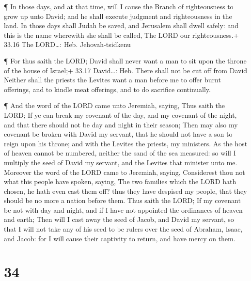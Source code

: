  ¶ In those days, and at that time, will I cause the Branch
of righteousness to grow up unto David; and he shall execute judgment
and righteousness in the land.  In those days shall Judah
be saved, and Jerusalem shall dwell safely: and this is the name
wherewith she shall be called, The LORD our righteousness.+ 33.16 The
LORD\ldots: Heb. Jehovah-tsidkenu

 ¶ For thus saith the LORD; David shall never want a man to
sit upon the throne of the house of Israel;+ 33.17 David\ldots: Heb.
There shall not be cut off from David  Neither shall the
priests the Levites want a man before me to offer burnt offerings, and
to kindle meat offerings, and to do sacrifice continually.

 ¶ And the word of the LORD came unto Jeremiah, saying,
 Thus saith the LORD; If ye can break my covenant of the
day, and my covenant of the night, and that there should not be day and
night in their season;  Then may also my covenant be broken
with David my servant, that he should not have a son to reign upon his
throne; and with the Levites the priests, my ministers.  As
the host of heaven cannot be numbered, neither the sand of the sea
measured: so will I multiply the seed of David my servant, and the
Levites that minister unto me.  Moreover the word of the
LORD came to Jeremiah, saying,  Considerest thou not what
this people have spoken, saying, The two families which the LORD hath
chosen, he hath even cast them off? thus they have despised my people,
that they should be no more a nation before them.  Thus
saith the LORD; If my covenant be not with day and night, and if I have
not appointed the ordinances of heaven and earth;  Then
will I cast away the seed of Jacob, and David my servant, so that I will
not take any of his seed to be rulers over the seed of Abraham, Isaac,
and Jacob: for I will cause their captivity to return, and have mercy on
them.

\hypertarget{section-33}{%
\section{34}\label{section-33}}


